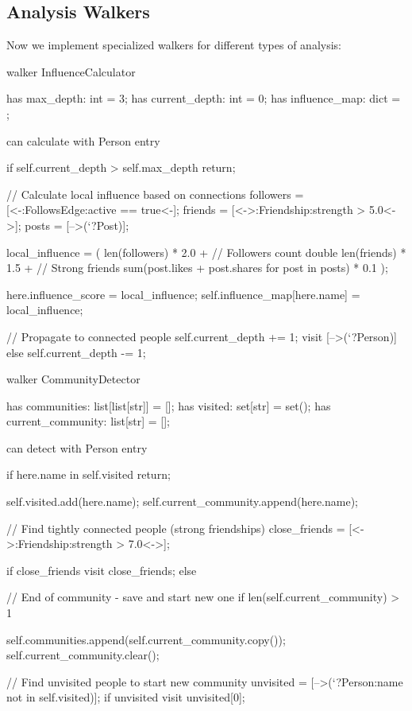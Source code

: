 \subsection{Analysis Walkers}

Now we implement specialized walkers for different types of analysis:

\begin{jacblock}
walker InfluenceCalculator {
    has max_depth: int = 3;
    has current_depth: int = 0;
    has influence_map: dict = {};

    can calculate with Person entry {
        if self.current_depth > self.max_depth {
            return;
        }

        // Calculate local influence based on connections
        followers = [<-:FollowsEdge:active == true<-];
        friends = [<->:Friendship:strength > 5.0<->];
        posts = [-->(`?Post)];

        local_influence = (
            len(followers) * 2.0 +  // Followers count double
            len(friends) * 1.5 +    // Strong friends
            sum(post.likes + post.shares for post in posts) * 0.1
        );

        here.influence_score = local_influence;
        self.influence_map[here.name] = local_influence;

        // Propagate to connected people
        self.current_depth += 1;
        visit [-->(`?Person)] else {
            self.current_depth -= 1;
        }
    }
}

walker CommunityDetector {
    has communities: list[list[str]] = [];
    has visited: set[str] = set();
    has current_community: list[str] = [];

    can detect with Person entry {
        if here.name in self.visited {
            return;
        }

        self.visited.add(here.name);
        self.current_community.append(here.name);

        // Find tightly connected people (strong friendships)
        close_friends = [<->:Friendship:strength > 7.0<->];

        if close_friends {
            visit close_friends;
        } else {
            // End of community - save and start new one
            if len(self.current_community) > 1 {
                self.communities.append(self.current_community.copy());
            self.current_community.clear();

            // Find unvisited people to start new community
            unvisited = [-->(`?Person:name not in self.visited)];
            if unvisited {
                visit unvisited[0];
        }
    }
}

}}
\end{jacblock}
